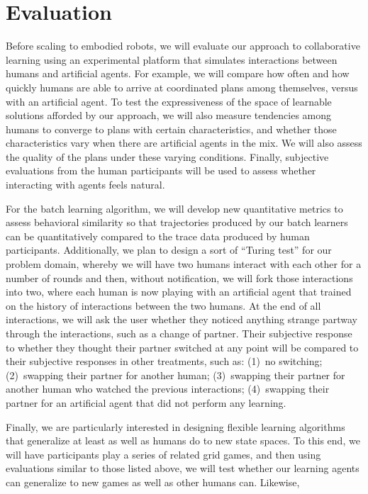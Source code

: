 
\section{Evaluation}

Before scaling to embodied robots,
we will evaluate our approach to collaborative learning using an
experimental platform that simulates interactions between humans and
artificial agents.  For example, we will compare how often and how
quickly humans are able to arrive at coordinated plans among
themselves, versus with an artificial agent.  To test the
expressiveness of the space of learnable solutions afforded by our
approach, we will also measure tendencies among humans to converge to
plans with certain characteristics, and whether those characteristics
vary when there are artificial agents in the mix.  We will also assess
the quality of the plans under these varying conditions.  Finally,
subjective evaluations from the human participants will be used to
assess whether interacting with agents feels natural.

For the batch learning algorithm, we will develop new quantitative
metrics to assess behavioral similarity so that trajectories produced
by our batch learners can be quantitatively compared to the trace data
produced by human participants.  Additionally, we plan to design a
sort of ``Turing test'' for our problem domain, whereby we will have
two humans interact with each other for a number of rounds and then,
without notification, we will fork those interactions into two, where
each human is now playing with an artificial agent that trained on the
history of interactions between the two humans.  At the end of all
interactions, we will ask the user whether they noticed anything
strange partway through the interactions, such as a change of partner.
Their subjective response to whether they thought their partner
switched at any point will be compared to their subjective responses
in other treatments, such as: (1)~no switching; (2)~swapping their
partner for another human; (3)~swapping their partner for another
human who watched the previous interactions; (4)~swapping their
partner for an artificial agent that did not perform any learning.

Finally, we are particularly interested in designing flexible learning
algorithms that generalize at least as well as humans do to new state
spaces.  To this end, we will have participants play a series of
related grid games, and then using evaluations similar to those listed
above, we will test whether our learning agents can generalize to new
games as well as other humans can.  Likewise,

